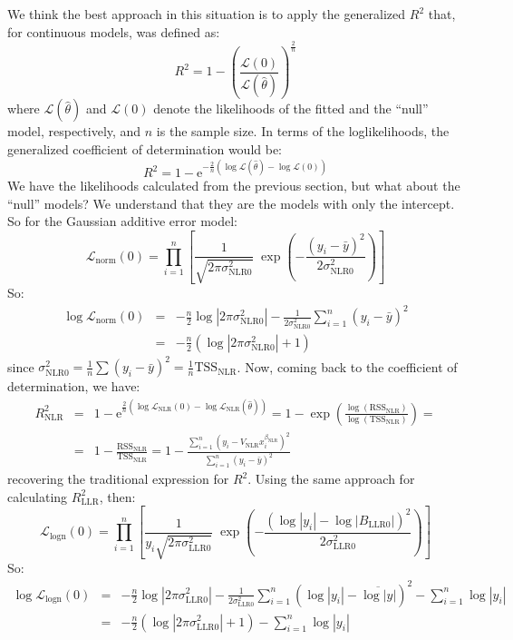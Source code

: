 \documentclass[12pt]{article}
\begin{document}
We think the best approach in this situation is to apply the generalized $R^2$ that, for continuous models, was defined as\cite{genR2}:
$$ R^2 = 1 - \left(\frac{\mathcal{L}(0)}{\mathcal{L}(\hat\theta)}\right)^{\!\!\frac{2}{n}} $$
where $\mathcal{L}(\hat\theta)$ and $\mathcal{L}(0)$  denote the likelihoods of the fitted and the ``null'' model, respectively, and $n$ is the sample size. In terms of the loglikelihoods, the generalized coefficient of determination would be:
$$ R^2 = 1 - \mathrm{e}^{-\frac{2}{n}\left(\log\mathcal{L}(\hat\theta)-\log\mathcal{L}(0)\right)} $$
We have the likelihoods calculated from the previous section, but what about the ``null'' models? We understand that they are the models with only the intercept. So for the Gaussian additive error model:
$$\mathcal{L}_\text{norm}(0) = \prod_{i=1}^n\left[\frac{1}{\sqrt{2\pi\sigma^2_\text{NLR0}}}\;\exp{\left(-\frac{\left(y_i-\bar y\right)^2}{2\sigma^2_\text{NLR0}}\right)}\right]$$
So:
\begin{eqnarray*}
\log\mathcal{L}_\text{norm}(0) &=& -\frac{n}{2}\log\left|2\pi\sigma^2_\text{NLR0}\right| - \frac{1}{2\sigma^2_\text{NLR0}}\sum_{i=1}^n\left(y_i-\bar y\right)^2\\
 &=& -\frac{n}{2}\left(\log\left|2\pi\sigma^2_\text{NLR0}\right| + 1 \right)
\end{eqnarray*}
since $\sigma^2_\text{NLR0}=\frac{1}{n}\sum\left(y_i-\bar y\right)^2=\frac{1}{n}\mathrm{TSS}_\text{NLR}$. Now, coming back to the coefficient of determination, we have:
\begin{eqnarray*}
R^2_\text{NLR} &=& 1 - \mathrm{e}^{\frac{2}{n}\left(\log\mathcal{L}_\text{NLR}(0)-\log\mathcal{L}_\text{NLR}(\hat\theta)\right)} = 1 - \exp{\left(\frac{\log(\mathrm{RSS}_\text{NLR})}{\log(\mathrm{TSS}_\text{NLR})}\right)}
 =\\ &=& 1 - \frac{\mathrm{RSS}_\text{NLR}}{\mathrm{TSS}_\text{NLR}} =
 1 - \frac{\sum_{i=1}^n\left(y_i-V_\text{NLR}x_i^{\beta_\text{NLR}}\right)^2}{\sum_{i=1}^n\left(y_i-\bar y\right)^2}
\end{eqnarray*}
recovering the traditional expression for $R^2$. Using the same approach for calculating $R^2_\text{LLR}$, then:
$$\mathcal{L}_\text{logn}(0) = \prod_{i=1}^n\left[\frac{1}{y_i\sqrt{2\pi\sigma^2_\text{LLR0}}}\;\exp{\left(-\frac{\left(\log|y_i|-\log|B_\text{LLR0}|\right)^2}{2\sigma^2_\text{LLR0}}\right)}\right]$$
So:
\begin{eqnarray*}
\log\mathcal{L}_\text{logn}(0) &=& -\frac{n}{2}\log\left|2\pi\sigma^2_\text{LLR0}\right| - \frac{1}{2\sigma^2_\text{LLR0}}\sum_{i=1}^n\left(\log|y_i|-\overline{\log|y|}\right)^2 - \sum_{i=1}^n\log|y_i|\\
 &=& -\frac{n}{2}\left(\log\left|2\pi\sigma^2_\text{LLR0}\right| + 1 \right) - \sum_{i=1}^n\log|y_i|
\end{eqnarray*}
\end{document}
